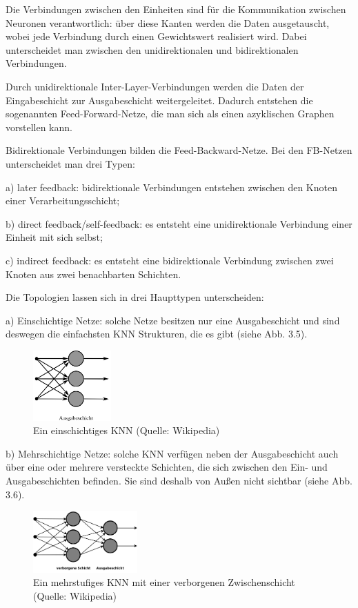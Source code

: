 Die Verbindungen zwischen den Einheiten sind für die Kommunikation zwischen Neuronen verantwortlich: über diese Kanten werden die Daten ausgetauscht, wobei jede Verbindung durch einen Gewichtswert realisiert wird. Dabei unterscheidet man zwischen den unidirektionalen und bidirektionalen Verbindungen.

Durch unidirektionale Inter-Layer-Verbindungen werden die Daten der Eingabeschicht zur Ausgabeschicht weitergeleitet. Dadurch entstehen die sogenannten Feed-Forward-Netze, die man sich als einen azyklischen Graphen vorstellen kann.

Bidirektionale Verbindungen bilden die Feed-Backward-Netze. Bei den FB-Netzen unterscheidet man drei Typen:

a) later feedback: bidirektionale Verbindungen entstehen zwischen den Knoten einer Verarbeitungsschicht;

b) direct feedback/self-feedback: es entsteht eine unidirektionale Verbindung einer Einheit mit sich selbst;

c) indirect feedback: es entsteht eine bidirektionale Verbindung zwischen zwei Knoten aus zwei benachbarten Schichten.

Die Topologien lassen sich in drei Haupttypen unterscheiden:

a) Einschichtige Netze: solche Netze besitzen nur eine Ausgabeschicht und sind deswegen die einfachsten KNN Strukturen, die es gibt (siehe Abb. 3.5).

\begin{figure}[h]
\centering
\includegraphics[width=3cm]{chapters/neural_networks/Single.jpg}

\caption{Ein einschichtiges KNN (Quelle: Wikipedia)}
	\label{img:single}
\end{figure}


b) Mehrschichtige Netze: solche KNN verfügen neben der Ausgabeschicht auch über eine oder mehrere versteckte Schichten, die sich zwischen den Ein- und Ausgabeschichten befinden. Sie sind deshalb von Außen nicht sichtbar (siehe Abb. 3.6).

\begin{figure}[h]
\centering
\includegraphics[width=4cm]{chapters/neural_networks/Multi-Layer.jpg}

\caption{Ein mehrstufiges KNN mit einer verborgenen Zwischenschicht (Quelle: Wikipedia)}
	\label{img:multi}
\end{figure}

